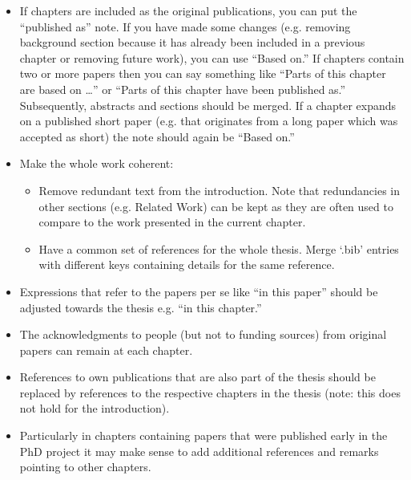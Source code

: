 \begin{itemize}
    \item If chapters are included as the original publications,
    you can put the ``published as'' note. If you have made some changes
    (e.g. removing background section because it has already been included
    in a previous chapter or removing future work), you can use ``Based on.''
    If chapters contain two or more papers then you can say
    something like ``Parts of this chapter are based on \dots'' or
    ``Parts of this chapter have been published as.'' Subsequently,
    abstracts and sections should be merged. If a chapter expands on
    a published short paper (e.g. that originates from a long paper
    which was accepted as short) the note should again be ``Based on.''
    
    \item Make the whole work coherent:
    \begin{itemize}
        \item Remove redundant text from the introduction. Note that
        redundancies in other sections (e.g. Related Work) can be kept
        as they are often used to compare to the work presented
        in the current chapter.
        \item Have a common set of references for the whole thesis.
        Merge `.bib' entries with different keys containing details
        for the same reference.
    \end{itemize}

    \item Expressions that refer to the papers per se like ``in this paper''
    should be adjusted towards the thesis e.g. ``in this chapter.''

    \item The acknowledgments to people (but not to funding sources)
    from original papers can remain at each chapter.
    
    \item References to own publications that are also part of the thesis
    should be replaced by references to the respective chapters in the thesis
    (note: this does not hold for the introduction).

    \item Particularly in chapters containing papers that were published
    early in the PhD project it may make sense to add additional references
    and remarks pointing to other chapters.
    

\end{itemize}
